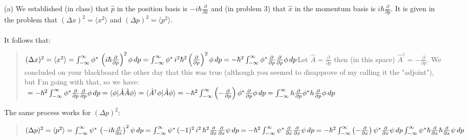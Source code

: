 \documentclass{article}
\begin{document}
(a) 
We established (in class) that $\hat{p}$ in the position basis
is $-i\hbar\frac{\partial}{\partial x}$ and (in problem 3) that
$\hat{x}$ in the momentum basis is $i\hbar\frac{\partial}{\partial p}$.
It is given in the problem that $(\Delta x)^2=\langle x^2\rangle$ and
$(\Delta p)^2=\langle p^2\rangle$.
\\\\
It follows that:
\begin{quote}
$
    (\Delta x)^2=\langle x^2\rangle =
    \int_{-\infty}^{\infty}
        \phi^*\,\left(i\hbar\frac{\partial}{\partial p}\right)^2\phi\,dp
    \vspace{12pt}\\
    = \int_{-\infty}^{\infty}
     \phi^*\,i^2\hbar^2\left(\frac{\partial}{\partial p}\right)^2\phi\,dp
    \vspace{12pt}\\
    = -\hbar^2\int_{-\infty}^{\infty}
     \phi^*
        \frac{\partial}{\partial p}
        \frac{\partial}{\partial p}\phi\,dp
    \vspace{12pt}\\
    $Let $\hat{A}=\frac{\partial}{\partial p}$ then (in this space)
    $\hat{A}^\dagger=-\frac{\partial}{\partial p}$. We
    concluded on your blackboard the other day that this was true
    (although you seemed to disapprove of
    my calling it the "adjoint"), but I'm going with that, so we have:$
    \vspace{12pt}\\
    = -\hbar^2\int_{-\infty}^{\infty}
     \phi^*
        \frac{\partial}{\partial p}
        \frac{\partial}{\partial p}\phi\,dp
    =\langle\phi|\hat{A}\hat{A}\phi\rangle
    = \langle\hat{A}^\dagger\phi|\hat{A}\phi\rangle
    = -\hbar^2\int_{-\infty}^{\infty}
        \left(-\frac{\partial}{\partial p}\right)
        \phi^*
        \frac{\partial}{\partial p}\phi\,dp
    \vspace{12pt}\\
    = \int_{-\infty}^{\infty}
        h\frac{\partial}{\partial p}
        \phi^*
        h\frac{\partial}{\partial p}\phi\,dp
$
\end{quote}
The same process works for $(\Delta p)^2$:
\begin{quote}
$
    (\Delta p)^2=\langle p^2\rangle =
    \int_{-\infty}^{\infty}
        \psi^*\,\left(-i\hbar\frac{\partial}{\partial x}\right)^2\psi\,dp
    \vspace{12pt}\\
    =\int_{-\infty}^{\infty}
        \psi^*\,(-1)^2\,i^2\,\hbar^2
        \frac{\partial}{\partial x}
        \frac{\partial}{\partial x}
        \psi\,dp
    =-\hbar^2\int_{-\infty}^{\infty}\psi^*
        \frac{\partial}{\partial x}
        \frac{\partial}{\partial x}
        \psi\,dp
    =-\hbar^2\int_{-\infty}^{\infty}
        \left(-\frac{\partial}{\partial x}\right)
        \psi^*
        \frac{\partial}{\partial x}
        \psi\,dp
    \vspace{12pt}\\
    \int_{-\infty}^{\infty}\psi^*
        \hbar\frac{\partial}{\partial x}
        \hbar\frac{\partial}{\partial x} \psi\,dp
$
\end{quote}
\end{document}
